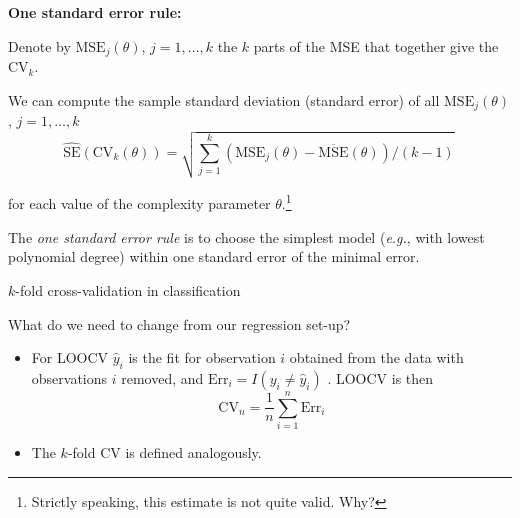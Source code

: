 \documentclass[10pt,ignorenonframetext,]{beamer}
\begin{document}
\begin{frame}

\textbf{One standard error rule:}

Denote by \(\text{MSE}_j(\theta)\), \(j=1,\ldots, k\) the \(k\) parts of
the MSE that together give the \(\text{CV}_k\).

We can compute the sample standard deviation (standard error) of all
\(\text{MSE}_j(\theta)\), \(j=1,\ldots, k\)
\[\hat{\text{SE}}(\text{CV}_k(\theta))= \sqrt{\sum_{j=1}^k (\text{MSE}_j(\theta) - \overline{\text{MSE}}(\theta))/(k-1)} \, \]

for each value of the complexity parameter
\(\theta\).\footnote{Strictly speaking, this estimate is not quite valid. Why?}

The \emph{one standard error rule} is to choose the simplest model
(\emph{e.g.}, with lowest polynomial degree) within one standard error
of the minimal error.

\end{frame}

\begin{frame}

\begin{block}{\(k\)-fold cross-validation in classification}

\vspace{3mm}

What do we need to change from our regression set-up?

\vspace{3mm}

\begin{itemize}
\item
  For LOOCV \(\hat{y}_i\) is the fit for observation \(i\) obtained from
  the data with observations \(i\) removed, and
  \({\text{Err}_i}=I(y_i\neq \hat{y}_i)\) . LOOCV is then
  \[\text{CV}_{n}=\frac{1}{n} \sum_{i=1}^n {\text{Err}_i}\]
\item
  The \(k\)-fold CV is defined analogously.
\end{itemize}

\end{block}

\end{frame}
\end{document}
